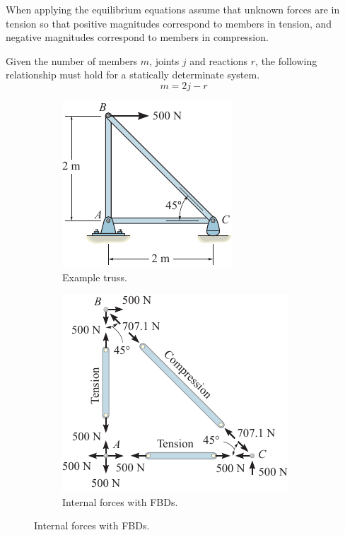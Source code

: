 \documentclass{article}
\begin{document}
When applying the equilibrium equations assume that unknown forces
are in tension so that positive magnitudes correspond to members in tension,
and negative magnitudes correspond to members in compression.
\begin{theorem}
    Given the number of members \(m\), joints \(j\) and reactions \(r\), the following
    relationship must hold for a statically determinate system.
    \begin{equation*}
        m = 2j - r
    \end{equation*}
\end{theorem}
\begin{figure}[H]
    \centering
    \begin{subfigure}{0.4\linewidth}
        \centering
        \includegraphics[width = 0.8\linewidth, keepaspectratio = true]{figures/method_of_joints_full.pdf}
        \caption{Example truss.}
    \end{subfigure}
    \begin{subfigure}{0.4\linewidth}
        \centering
        \includegraphics[width = 0.8\linewidth, keepaspectratio = true]{figures/method_of_joints_all.pdf}
        \caption{Internal forces with FBDs.}
    \end{subfigure}


\end{figure}
\end{document}
